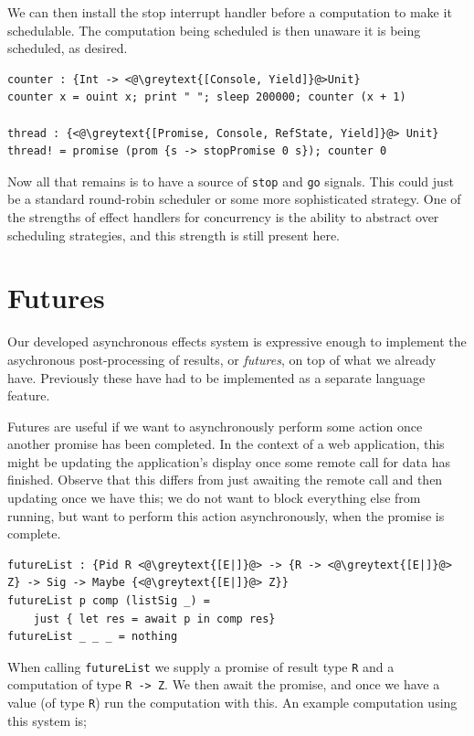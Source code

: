 \documentclass[msc,deptreport,cs]{infthesis} %
\newcommand{\code}[1]{\lstinline{#1}}
\newcommand{\greytext}[1]{\textcolor{black!40}{#1}}
\newcommand{\todo}[1]
           {{\par\noindent\small\color{RoyalPurple}
  \framebox{\parbox{\dimexpr\linewidth-2\fboxsep-2\fboxrule}
    {\textbf{TODO:} #1}}}}
\begin{document}
We can then install the stop interrupt handler before a computation to make it
schedulable. The computation being scheduled is then unaware it is being
scheduled, as desired.

\begin{lstlisting}
counter : {Int -> <@\greytext{[Console, Yield]}@>Unit}
counter x = ouint x; print " "; sleep 200000; counter (x + 1)

thread : {<@\greytext{[Promise, Console, RefState, Yield]}@> Unit}
thread! = promise (prom {s -> stopPromise 0 s}); counter 0
\end{lstlisting}

Now all that remains is to have a source of \code{stop} and \code{go} signals.
This could just be a standard round-robin scheduler or some more sophisticated
strategy. One of the strengths of effect handlers for concurrency is the ability
to abstract over scheduling strategies, and this strength is still present here.

\section{Futures}
\label{sec:futures}

Our developed asynchronous effects system is expressive enough to implement the
asychronous post-processing of results, or \emph{futures}, on top of what we
already have. Previously these have had to be implemented as a separate language
feature. \todo{Reference for being a separate feature!}

Futures are useful if we want to asynchronously perform some action once another
promise has been completed. In the context of a web application, this might be
updating the application's display once some remote call for data has finished.
Observe that this differs from just awaiting the remote call and then updating
once we have this; we do not want to block everything else from running, but
want to perform this action asynchronously, when the promise is complete.

\begin{lstlisting}
futureList : {Pid R <@\greytext{[E|]}@> -> {R -> <@\greytext{[E|]}@> Z} -> Sig -> Maybe {<@\greytext{[E|]}@> Z}}
futureList p comp (listSig _) =
    just { let res = await p in comp res}
futureList _ _ _ = nothing
\end{lstlisting}

\noindent When calling \code{futureList} we supply a promise of result type
\code{R} and a computation of type \code{R -> Z}. We then await the promise, and
once we have a value (of type \code{R}) run the computation with this. An
example computation using this system is;
\end{document}
